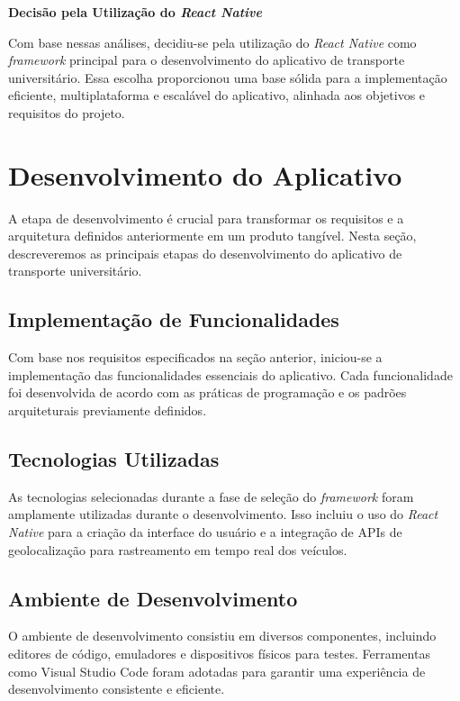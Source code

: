 \documentclass[
    12pt,                   %
    openright,              %
    oneside,                %
    a4paper,                %
    sumario=tradicional,    %
    english,                %
    brazil,                 %
    ]{abntex2}
\begin{document}
        \textbf{Decisão pela Utilização do \textit{React Native}}
        
        Com base nessas análises, decidiu-se pela utilização do \textit{React Native} como \textit{framework} principal para o desenvolvimento do aplicativo de transporte universitário. Essa escolha proporcionou uma base sólida para a implementação eficiente, multiplataforma e escalável do aplicativo, alinhada aos objetivos e requisitos do projeto.
    
    
    \section{Desenvolvimento do Aplicativo}
    \label{sec:desenvolvimento-aplicativo}
    
        A etapa de desenvolvimento é crucial para transformar os requisitos e a arquitetura definidos anteriormente em um produto tangível. Nesta seção, descreveremos as principais etapas do desenvolvimento do aplicativo de transporte universitário.
        
        \subsection{Implementação de Funcionalidades}
        
        Com base nos requisitos especificados na seção anterior, iniciou-se a implementação das funcionalidades essenciais do aplicativo. Cada funcionalidade foi desenvolvida de acordo com as práticas de programação e os padrões arquiteturais previamente definidos.
        
        \subsection{Tecnologias Utilizadas}
        
        As tecnologias selecionadas durante a fase de seleção do \textit{framework} foram amplamente utilizadas durante o desenvolvimento. Isso incluiu o uso do \textit{React Native} para a criação da interface do usuário e a integração de APIs de geolocalização para rastreamento em tempo real dos veículos.
        
        \subsection{Ambiente de Desenvolvimento}
        
        O ambiente de desenvolvimento consistiu em diversos componentes, incluindo editores de código, emuladores e dispositivos físicos para testes. Ferramentas como Visual Studio Code foram adotadas para garantir uma experiência de desenvolvimento consistente e eficiente.
        
\end{document}
